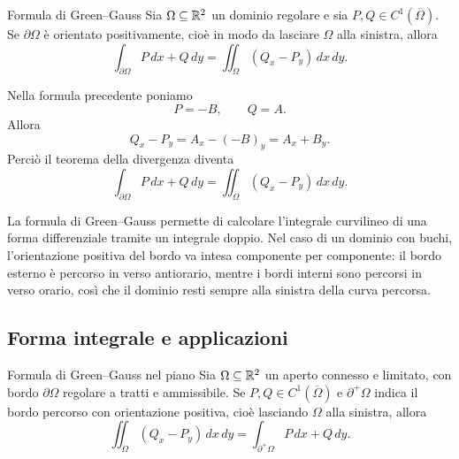 \documentclass[a4paper]{article}
\begin{document}
\begin{radioactive}
\begin{snippettheorem}{Formula di Green--Gauss}
    Sia \(\Omega\subseteq\mathbb{R}^2\) un dominio regolare e sia \(P,Q\in C^1(\overline{\Omega})\). Se \(\partial\Omega\) è orientato positivamente, cioè in modo da lasciare \(\Omega\) alla sinistra, allora
    \[
        \int_{\partial\Omega}P\,dx+Q\,dy
        =
        \iint_{\Omega}\left(Q_x-P_y\right)\,dx\,dy.
    \]
\end{snippettheorem}
\end{radioactive}

\begin{radioactive}
\begin{snippetproof}{}
    Nella formula precedente poniamo
    \[
        P=-B,
        \qquad
        Q=A.
    \]
    Allora
    \[
        Q_x-P_y=A_x-(-B)_y=A_x+B_y.
    \]
    Perciò il teorema della divergenza diventa
    \[
        \int_{\partial\Omega}P\,dx+Q\,dy
        =
        \iint_{\Omega}(Q_x-P_y)\,dx\,dy.
    \]
\end{snippetproof}
\end{radioactive}

\begin{radioactive}
La formula di Green--Gauss permette di calcolare l'integrale curvilineo di una forma differenziale tramite un integrale doppio. Nel caso di un dominio con buchi, l'orientazione positiva del bordo va intesa componente per componente: il bordo esterno è percorso in verso antiorario, mentre i bordi interni sono percorsi in verso orario, così che il dominio resti sempre alla sinistra della curva percorsa.
\end{radioactive}

\subsection{Forma integrale e applicazioni}

\begin{radioactive}
\begin{snippettheorem}{Formula di Green--Gauss nel piano}
    Sia \(\Omega\subseteq\mathbb{R}^2\) un aperto connesso e limitato, con bordo \(\partial\Omega\) regolare a tratti e ammissibile. Se \(P,Q\in C^1(\overline{\Omega})\) e \(\partial^+\Omega\) indica il bordo percorso con orientazione positiva, cioè lasciando \(\Omega\) alla sinistra, allora
    \[
        \iint_\Omega (Q_x-P_y)\,dx\,dy
        =
        \int_{\partial^+\Omega} P\,dx+Q\,dy.
    \]
\end{snippettheorem}
\end{radioactive}
\end{document}
